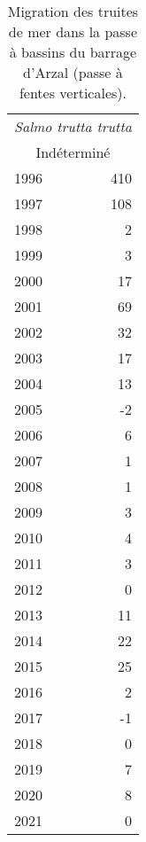 \begin{table}[ht]
\centering
\begin{tabular}{lr}
  \toprule
  \multicolumn{2}{c}{\textit{Salmo trutta trutta}}  \\
 
						\multicolumn{2}{c}{Indéterminé} \\ \midrule
1996 & 410 \\ 
  1997 & 108 \\ 
  1998 & 2 \\ 
  1999 & 3 \\ 
  2000 & 17 \\ 
  2001 & 69 \\ 
  2002 & 32 \\ 
  2003 & 17 \\ 
  2004 & 13 \\ 
  2005 & -2 \\ 
  2006 & 6 \\ 
  2007 & 1 \\ 
  2008 & 1 \\ 
  2009 & 3 \\ 
  2010 & 4 \\ 
  2011 & 3 \\ 
  2012 & 0 \\ 
  2013 & 11 \\ 
  2014 & 22 \\ 
  2015 & 25 \\ 
  2016 & 2 \\ 
  2017 & -1 \\ 
  2018 & 0 \\ 
  2019 & 7 \\ 
  2020 & 8 \\ 
  2021 & 0 \\ 
   \bottomrule
\end{tabular}
\caption{Migration des truites de mer dans la passe à bassins du barrage
				d'Arzal (passe à fentes verticales).} 
\label{table_bilanannuel_trm}
\end{table}

